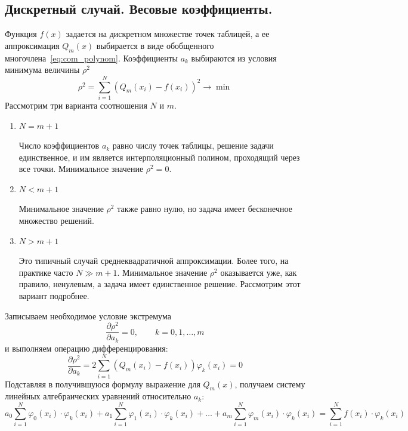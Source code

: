 \subsection{Дискретный случай. Весовые коэффициенты.}
Функция $f(x)$ задается на дискретном множестве точек таблицей, а ее аппроксимация $Q_m(x)$ выбирается в виде обобщенного
многочлена~\eqref{eq:com_polynom}. Коэффициенты $a_k$ выбираются из условия минимума величины $\rho^2$
\begin{equation}
    \rho^2 = \sum_{i=1}^{N} \left( Q_m(x_i) - f(x_i) \right)^2 \rightarrow \min \label{eq:approx_criteria}
\end{equation}
Рассмотрим три варианта соотношения $N$ и $m$.
\begin{enumerate}
    \item $N = m + 1$

    Число коэффициентов $a_k$ равно числу точек таблицы, решение задачи единственное, и им является интерполяционный
    полином, проходящий через все точки. Минимальное значение $\rho^2 = 0$.
    \item $N < m + 1$

    Минимальное значение $\rho^2$ также равно нулю, но задача имеет бесконечное множество решений.
    \item $N > m + 1$

    Это типичный случай среднеквадратичной аппроксимации. Более того, на практике часто $N \gg m + 1$. Минимальное
    значение $\rho^2$ оказывается уже, как правило, ненулевым, а задача имеет единственное решение. Рассмотрим этот вариант
    подробнее.
\end{enumerate}
Записываем необходимое условие экстремума
\begin{equation*}
    \frac{\partial \rho^2}{\partial a_k} = 0, \qquad k=0,1,\dots,m
\end{equation*}
и выполняем операцию дифференцирования:
\begin{equation*}
    \frac{\partial \rho^2}{\partial a_k} = 2 \sum_{i=1}^{N} \left( Q_m(x_i) - f(x_i) \right)\varphi_k(x_i) = 0
\end{equation*}
Подставляя в получившуюся формулу выражение для $Q_m(x)$, получаем систему линейных алгебраических уравнений
относительно $a_k$:
\begin{equation}
    \label{eq:approx_eqsys}
    a_0 \sum_{i=1}^{N} \varphi_0(x_i)\cdot \varphi_k(x_i) + a_1 \sum_{i=1}^{N} \varphi_1(x_i)\cdot \varphi_k(x_i) + \dots + a_m \sum_{i=1}^{N} \varphi_m(x_i) \cdot \varphi_k(x_i) = \sum_{i=1}^{N} f(x_i) \cdot \varphi_k(x_i)
\end{equation}

